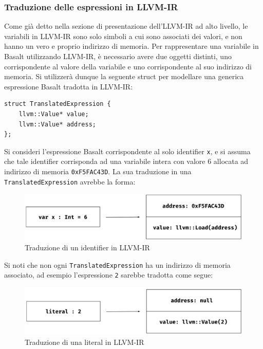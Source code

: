 \subsubsection{Traduzione delle espressioni in LLVM-IR}
Come già detto nella sezione di presentazione dell'LLVM-IR ad alto livello, le variabili in LLVM-IR sono 
solo simboli a cui sono associati dei valori, e non hanno un vero e proprio indirizzo di memoria. Per rappresentare 
una variabile in Basalt utilizzando LLVM-IR, è necessario avere due oggetti distinti, uno corrispondente al valore 
della variabile e uno corrispondente al suo indirizzo di memoria. Si utilizzerà dunque la seguente struct per modellare 
una generica espressione Basalt tradotta in LLVM-IR:

\vspace{0.5cm}
\begin{lstlisting}[frame=single]
struct TranslatedExpression {
    llvm::Value* value;
    llvm::Value* address;
};
\end{lstlisting}
\vspace{0.5cm}

Si consideri l'espressione Basalt corrispondente al solo identifier \texttt{x}, e si assuma che tale identifier corrisponda 
ad una variabile intera con valore 6 allocata ad indirizzo di memoria \texttt{0xF5FAC43D}. La sua traduzione in una \texttt{TranslatedExpression} 
avrebbe la forma:

\vspace{0.3cm}
\begin{figure}[H]
    \includegraphics[width=\textwidth]{../../Assets/LLVMExpr1}
    \caption{Traduzione di un identifier in LLVM-IR}
\end{figure}
\vspace{0.3cm}

Si noti che non ogni \texttt{TranslatedExpression} ha un indirizzo di memoria associato, ad esempio l'espressione \texttt{2}
sarebbe tradotta come segue: \\

\vspace{0.3cm}
\begin{figure}[H]
    \includegraphics[width=\textwidth]{../../Assets/LLVMExpr2}
    \caption{Traduzione di una literal in LLVM-IR}
\end{figure}
\vspace{0.3cm}

